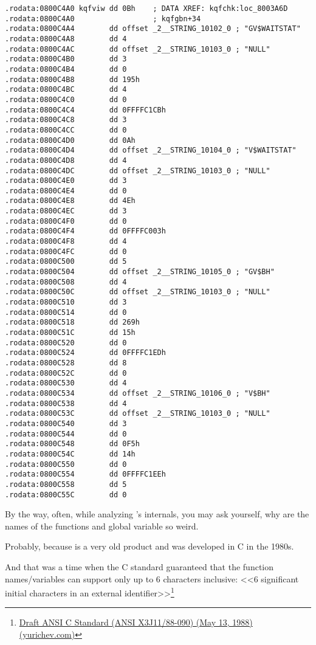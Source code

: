 \begin{lstlisting}[caption=kqf.o]
.rodata:0800C4A0 kqfviw dd 0Bh    ; DATA XREF: kqfchk:loc_8003A6D
.rodata:0800C4A0                  ; kqfgbn+34
.rodata:0800C4A4        dd offset _2__STRING_10102_0 ; "GV$WAITSTAT"
.rodata:0800C4A8        dd 4
.rodata:0800C4AC        dd offset _2__STRING_10103_0 ; "NULL"
.rodata:0800C4B0        dd 3
.rodata:0800C4B4        dd 0
.rodata:0800C4B8        dd 195h
.rodata:0800C4BC        dd 4
.rodata:0800C4C0        dd 0
.rodata:0800C4C4        dd 0FFFFC1CBh
.rodata:0800C4C8        dd 3
.rodata:0800C4CC        dd 0
.rodata:0800C4D0        dd 0Ah
.rodata:0800C4D4        dd offset _2__STRING_10104_0 ; "V$WAITSTAT"
.rodata:0800C4D8        dd 4
.rodata:0800C4DC        dd offset _2__STRING_10103_0 ; "NULL"
.rodata:0800C4E0        dd 3
.rodata:0800C4E4        dd 0
.rodata:0800C4E8        dd 4Eh
.rodata:0800C4EC        dd 3
.rodata:0800C4F0        dd 0
.rodata:0800C4F4        dd 0FFFFC003h
.rodata:0800C4F8        dd 4
.rodata:0800C4FC        dd 0
.rodata:0800C500        dd 5
.rodata:0800C504        dd offset _2__STRING_10105_0 ; "GV$BH"
.rodata:0800C508        dd 4
.rodata:0800C50C        dd offset _2__STRING_10103_0 ; "NULL"
.rodata:0800C510        dd 3
.rodata:0800C514        dd 0
.rodata:0800C518        dd 269h
.rodata:0800C51C        dd 15h
.rodata:0800C520        dd 0
.rodata:0800C524        dd 0FFFFC1EDh
.rodata:0800C528        dd 8
.rodata:0800C52C        dd 0
.rodata:0800C530        dd 4
.rodata:0800C534        dd offset _2__STRING_10106_0 ; "V$BH"
.rodata:0800C538        dd 4
.rodata:0800C53C        dd offset _2__STRING_10103_0 ; "NULL"
.rodata:0800C540        dd 3
.rodata:0800C544        dd 0
.rodata:0800C548        dd 0F5h
.rodata:0800C54C        dd 14h
.rodata:0800C550        dd 0
.rodata:0800C554        dd 0FFFFC1EEh
.rodata:0800C558        dd 5
.rodata:0800C55C        dd 0
\end{lstlisting}

By the way, often, while analyzing \oracle's internals, you may ask yourself, why are the names of the functions and global variable so weird.

Probably, because \oracle is a very old product and was developed in C in the 1980s.

And that was a time when the C standard guaranteed that the function names/variables can support only up to 6 characters inclusive: <<6 significant initial characters in an external identifier>>\footnote{\href{http://go.yurichev.com/17142}{Draft ANSI C Standard (ANSI X3J11/88-090) (May 13, 1988) (yurichev.com)}}

